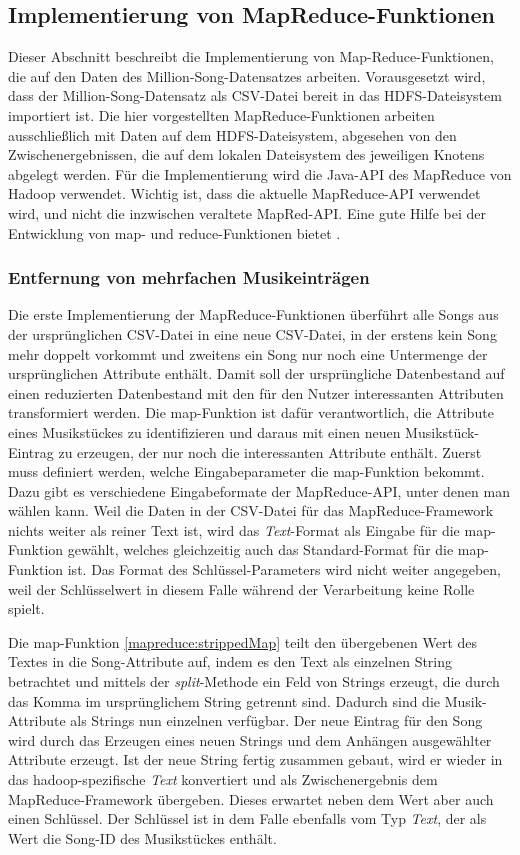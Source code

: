\subsection{Implementierung von MapReduce-Funktionen}

Dieser Abschnitt beschreibt die Implementierung von Map-Reduce-Funktionen, die auf den Daten
des Million-Song-Datensatzes arbeiten. Vorausgesetzt wird, dass der Million-Song-Datensatz als
CSV-Datei bereit in das HDFS-Dateisystem importiert ist. Die hier vorgestellten MapReduce-Funktionen
arbeiten ausschließlich mit Daten auf dem HDFS-Dateisystem, abgesehen von den Zwischenergebnissen,
die auf dem lokalen Dateisystem des jeweiligen Knotens abgelegt werden.
Für die Implementierung wird die Java-API des MapReduce von Hadoop verwendet. Wichtig ist,
dass die aktuelle MapReduce-API verwendet wird, und nicht die inzwischen veraltete MapRed-API.
Eine gute Hilfe bei der Entwicklung von map- und reduce-Funktionen bietet \cite{miner2012mapreduce}.

\subsubsection{Entfernung von mehrfachen Musikeinträgen}
\label{section:mehrfacheSongs}
Die erste Implementierung der MapReduce-Funktionen überführt alle Songs aus der ursprünglichen
CSV-Datei in eine neue CSV-Datei, in der erstens kein Song mehr doppelt vorkommt und zweitens
ein Song nur noch eine Untermenge der ursprünglichen Attribute enthält. Damit soll der ursprüngliche
Datenbestand auf einen reduzierten Datenbestand mit den für den Nutzer interessanten Attributen 
transformiert werden. Die map-Funktion ist dafür verantwortlich, die Attribute eines Musikstückes
zu identifizieren und daraus mit einen neuen Musikstück-Eintrag zu erzeugen, der nur noch die interessanten
Attribute enthält.
Zuerst muss definiert werden, welche Eingabeparameter die map-Funktion bekommt. Dazu gibt es verschiedene
Eingabeformate der MapReduce-API, unter denen man wählen kann. Weil die Daten in der CSV-Datei für das
MapReduce-Framework nichts weiter als reiner Text ist, wird das \textit{Text}-Format als Eingabe für
die map-Funktion gewählt, welches gleichzeitig auch das Standard-Format für die map-Funktion ist.
Das Format des Schlüssel-Parameters wird nicht weiter angegeben, weil der Schlüsselwert in diesem Falle 
während der Verarbeitung keine Rolle spielt.

Die map-Funktion \ref{mapreduce:strippedMap} teilt den übergebenen Wert des Textes in die Song-Attribute auf, indem es den Text
als einzelnen String betrachtet und mittels der \textit{split}-Methode ein Feld von Strings erzeugt, die durch
das Komma im ursprünglichem String getrennt sind. Dadurch sind die Musik-Attribute als Strings nun einzelnen verfügbar.
Der neue Eintrag für den Song wird durch das Erzeugen eines neuen Strings und dem Anhängen ausgewählter
Attribute erzeugt. Ist der neue String fertig zusammen gebaut, wird er wieder in das hadoop-spezifische \textit{Text}
konvertiert und als Zwischenergebnis dem MapReduce-Framework übergeben. Dieses erwartet neben dem 
Wert aber auch einen Schlüssel. Der Schlüssel ist in dem Falle ebenfalls vom Typ \textit{Text}, der als Wert die
Song-ID des Musikstückes enthält.

